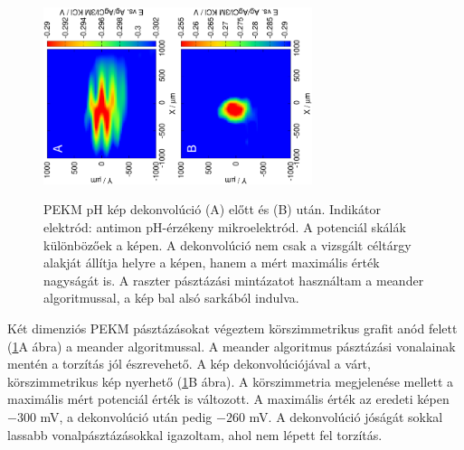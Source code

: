 \begin{figure}
\centering
\includegraphics[trim = 10mm 30mm 0mm 10mm, clip, width=0.35\textwidth, angle=-90]{img/pH_2D_Sb/13121313.eps}\includegraphics[trim = 10mm 30mm 0mm 10mm, clip, width=0.35\textwidth, angle=-90]{img/pH_2D_Sb/13121313_deconvoluted.eps}%
\caption{PEKM pH kép dekonvolúció (A) előtt és (B) után.
Indikátor elektród: antimon pH-érzékeny mikroelektród.
A potenciál skálák különbözőek a képen.
A dekonvolúció nem csak a vizsgált céltárgy alakját állítja helyre a képen, hanem a mért maximális érték nagyságát is.
A raszter pásztázási mintázatot használtam a meander algoritmussal, a kép bal alsó sarkából indulva.}
\label{fig:deconvolution}
\end{figure}

Két dimenziós PEKM pásztázásokat végeztem körszimmetrikus grafit anód felett (\ref{fig:deconvolution}A ábra) a meander algoritmussal.
A meander algoritmus pásztázási vonalainak mentén a torzítás jól észrevehető.
A kép dekonvolúciójával a várt, körszimmetrikus kép nyerhető (\ref{fig:deconvolution}B ábra).
A körszimmetria megjelenése mellett a maximális mért potenciál érték is változott.
A maximális érték az eredeti képen $-300$ mV, a dekonvolúció után pedig $-260$ mV.
A dekonvolúció jóságát sokkal lassabb vonalpásztázásokkal igazoltam, ahol nem lépett fel torzítás.

